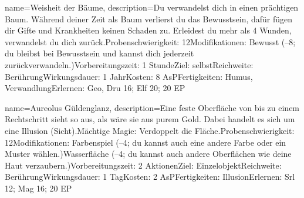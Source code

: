{
    name={Weisheit der Bäume},
    description={Du verwandelst dich in einen prächtigen Baum. Während deiner Zeit als Baum verlierst du das Bewusstsein, dafür fügen dir Gifte und Krankheiten keinen Schaden zu. Erleidest du mehr als 4 Wunden, verwandelst du dich zurück.\newline Probenschwierigkeit: 12\newline Modifikationen: Bewusst (–8; du bleibst bei Bewusstsein und kannst dich jederzeit zurückverwandeln.)\newline Vorbereitungszeit: 1 Stunde\newline Ziel: selbst\newline Reichweite: Berührung\newline Wirkungsdauer: 1 Jahr\newline Kosten: 8 AsP\newline Fertigkeiten: Humus, Verwandlung\newline Erlernen: Geo, Dru 16; Elf 20; 20 EP}
}


{
    name={Aureolus Güldenglanz},
    description={Eine feste Oberfläche von bis zu einem Rechtschritt sieht so aus, als wäre sie aus purem Gold. Dabei handelt es sich um eine Illusion (Sicht).\newline Mächtige Magie: Verdoppelt die Fläche.\newline Probenschwierigkeit: 12\newline Modifikationen: Farbenspiel (–4; du kannst auch eine andere Farbe oder ein Muster wählen.)\newline Wasserfläche (–4; du kannst auch andere Oberflächen wie deine Haut verzaubern.)\newline Vorbereitungszeit: 2 Aktionen\newline Ziel: Einzelobjekt\newline Reichweite: Berührung\newline Wirkungsdauer: 1 Tag\newline Kosten: 2 AsP\newline Fertigkeiten: Illusion\newline Erlernen: Srl 12; Mag 16; 20 EP}
}


